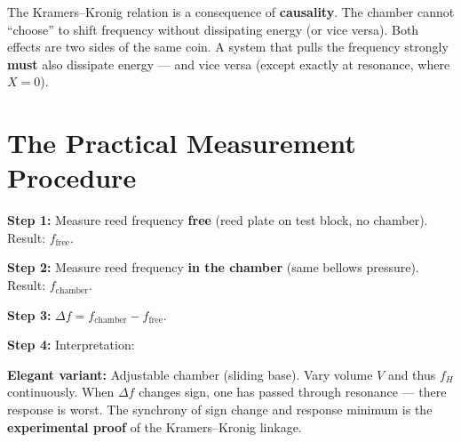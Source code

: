 \documentclass[11pt,a4paper]{article}
\begin{document}
\begin{keybox}
The Kramers--Kronig relation is a consequence of \textbf{causality}. The chamber cannot ``choose'' to shift frequency without dissipating energy (or vice versa). Both effects are two sides of the same coin. A system that pulls the frequency strongly \textbf{must} also dissipate energy --- and vice versa (except exactly at resonance, where $X = 0$).
\end{keybox}

\section{The Practical Measurement Procedure}

\textbf{Step 1:} Measure reed frequency \textbf{free} (reed plate on test block, no chamber). Result: $f_\text{free}$.

\textbf{Step 2:} Measure reed frequency \textbf{in the chamber} (same bellows pressure). Result: $f_\text{chamber}$.

\textbf{Step 3:} $\Delta f = f_\text{chamber} - f_\text{free}$.

\textbf{Step 4:} Interpretation:

\begin{table}[H]
\centering\small
{}
\caption{Interpretation key: $\Delta f \to$ response prognosis}
\end{table}

\textbf{Elegant variant:} Adjustable chamber (sliding base). Vary volume $V$ and thus $f_H$ continuously. When $\Delta f$ changes sign, one has passed through resonance --- there response is worst. The synchrony of sign change and response minimum is the \textbf{experimental proof} of the Kramers--Kronig linkage.
\end{document}
